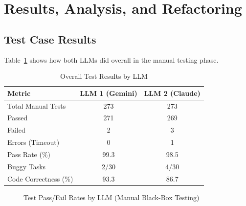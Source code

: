 \documentclass[12pt, a4paper]{article}
\begin{document}
\section{Results, Analysis, and Refactoring}
\label{sec:results}

\subsection{Test Case Results}

Table~\ref{tab:overall-results} shows how both LLMs did overall in the manual testing phase.

\begin{table}[H]
\centering
\caption{Overall Test Results by LLM}
\label{tab:overall-results}
\begin{tabularx}{\textwidth}{l c c}
\toprule
\textbf{Metric} & \textbf{LLM 1 (Gemini)} & \textbf{LLM 2 (Claude)} \\
\midrule
Total Manual Tests      & 273 & 273 \\
Passed                  & 271 & 269 \\
Failed                  & 2   & 3   \\
Errors (Timeout)        & 0   & 1   \\
Pass Rate (\%)          & 99.3 & 98.5 \\
Buggy Tasks             & 2/30 & 4/30 \\
Code Correctness (\%)   & 93.3 & 86.7 \\
\bottomrule
\end{tabularx}
\end{table}

\begin{figure}[H]
\centering
{}
\caption{Test Pass/Fail Rates by LLM (Manual Black-Box Testing)}
\label{fig:pass-fail-chart}
\end{figure}
\end{document}
